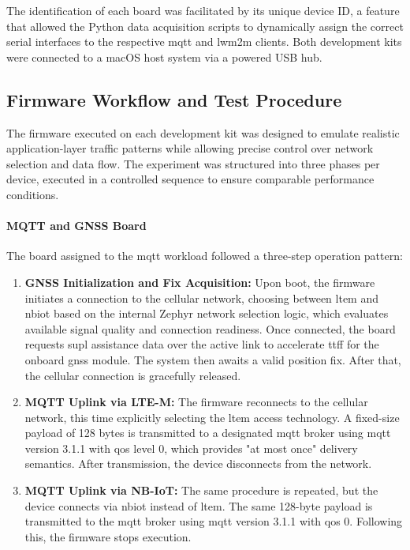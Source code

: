 \documentclass[12pt, english, openany]{book}
\begin{document}
The identification of each board was facilitated by its unique device ID, a feature that allowed the Python data acquisition scripts to dynamically assign the correct serial interfaces to the respective \gls{mqtt} and \gls{lwm2m} clients. Both development kits were connected to a macOS host system via a powered USB hub.


\subsection{Firmware Workflow and Test Procedure}

The firmware executed on each development kit was designed to emulate realistic application-layer traffic patterns while allowing precise control over network selection and data flow. The experiment was structured into three phases per device, executed in a controlled sequence to ensure comparable performance conditions.

\paragraph{MQTT and GNSS Board}

The board assigned to the \gls{mqtt} workload followed a three-step operation pattern:

\begin{enumerate}
    \item \textbf{GNSS Initialization and Fix Acquisition:}
          Upon boot, the firmware initiates a connection to the cellular network, choosing between \gls{ltem} and \gls{nbiot} based on the internal Zephyr network selection logic, which evaluates available signal quality and connection readiness. Once connected, the board requests \gls{supl} assistance data over the active link to accelerate \gls{ttff} for the onboard \gls{gnss} module. The system then awaits a valid position fix. After that, the cellular connection is gracefully released.

    \item \textbf{MQTT Uplink via LTE-M:}
          The firmware reconnects to the cellular network, this time explicitly selecting the \gls{ltem} access technology. A fixed-size payload of 128 bytes is transmitted to a designated \gls{mqtt} broker using \gls{mqtt} version 3.1.1 with \gls{qos} level 0, which provides "at most once" delivery semantics. After transmission, the device disconnects from the network.

    \item \textbf{MQTT Uplink via NB-IoT:}
          The same procedure is repeated, but the device connects via \gls{nbiot} instead of \gls{ltem}. The same 128-byte payload is transmitted to the \gls{mqtt} broker using \gls{mqtt} version 3.1.1 with \gls{qos} 0. Following this, the firmware stops execution.
\end{enumerate}
\end{document}
